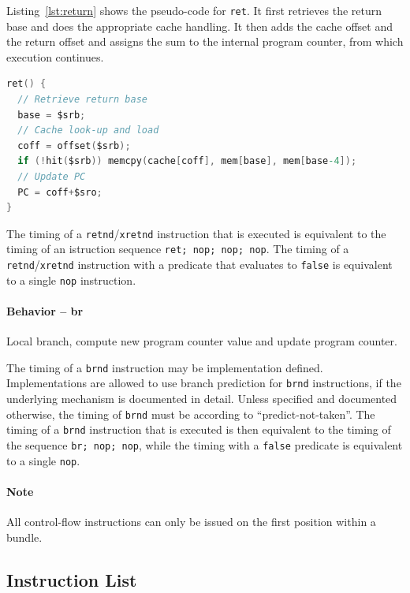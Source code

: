 \documentclass[a4paper,fontsize=10pt,twoside,DIV15,BCOR12mm,headinclude=true,footinclude=false,pagesize,bibtotoc]{scrbook}
\begin{document}
Listing~\ref{lst:return} shows the pseudo-code for \texttt{ret}. It
first retrieves the return base and does the appropriate cache
handling. It then adds the cache offset and the return offset and
assigns the sum to the internal program counter, from which execution
continues.

\begin{lstlisting}[language=C,float=h,caption={Return\label{lst:return}}]
ret() {
  // Retrieve return base
  base = $srb;
  // Cache look-up and load
  coff = offset($srb);
  if (!hit($srb)) memcpy(cache[coff], mem[base], mem[base-4]);
  // Update PC
  PC = coff+$sro;
}
\end{lstlisting}

The timing of a \texttt{retnd}/\texttt{xretnd} instruction that is
executed is equivalent to the timing of an istruction sequence
\texttt{ret; nop; nop; nop}. The timing of a
\texttt{retnd}/\texttt{xretnd} instruction with a predicate that
evaluates to \texttt{false} is equivalent to a single \texttt{nop}
instruction.

\paragraph{Behavior -- br}

Local branch, compute new program counter value and update program
counter.

The timing of a \texttt{brnd} instruction may be implementation
defined. Implementations are allowed to use branch prediction for
\texttt{brnd} instructions, if the underlying mechanism is documented
in detail. Unless specified and documented otherwise, the timing of
\texttt{brnd} must be according to ``predict-not-taken''. The timing
of a \texttt{brnd} instruction that is executed is then equivalent to
the timing of the sequence \texttt{br; nop; nop}, while the timing
with a \texttt{false} predicate is equivalent to a single
\texttt{nop}.

\paragraph{Note}

All control-flow instructions can only be issued on the first position
within a bundle.

\clearpage
\subsection{Instruction List}
\end{document}
